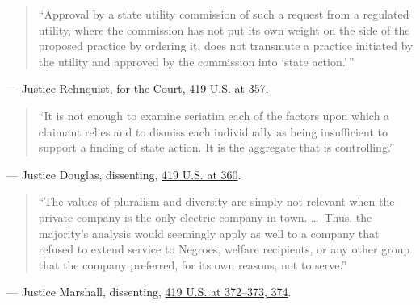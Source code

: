 \documentclass[12pt]{article}
\begin{document}
\begin{quote}
``Approval by a state utility commission of such a request from a regulated utility, where the commission has not put its own weight on the side of the proposed practice by ordering it, does not transmute a practice initiated by the utility and approved by the commission into `state action.'\,''
\end{quote}
\noindent --- Justice Rehnquist, for the Court, \href{https://supreme.justia.com/cases/federal/us/419/345/}{419 U.S. at 357}.

\begin{quote}
``It is not enough to examine seriatim each of the factors upon which a claimant relies and to dismiss each individually as being insufficient to support a finding of state action. It is the aggregate that is controlling.''
\end{quote}
\noindent --- Justice Douglas, dissenting, \href{https://supreme.justia.com/cases/federal/us/419/345/}{419 U.S. at 360}.

\begin{quote}
``The values of pluralism and diversity are simply not relevant when the private company is the only electric company in town. \dots\ Thus, the majority's analysis would seemingly apply as well to a company that refused to extend service to Negroes, welfare recipients, or any other group that the company preferred, for its own reasons, not to serve.''
\end{quote}
\noindent --- Justice Marshall, dissenting, \href{https://supreme.justia.com/cases/federal/us/419/345/}{419 U.S. at 372--373, 374}.
\end{document}
